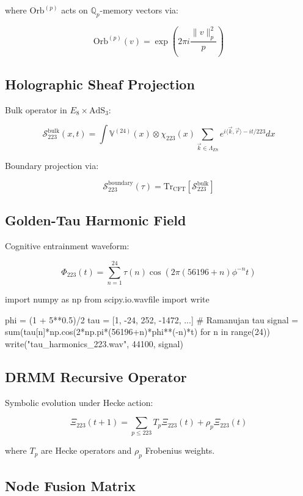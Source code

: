 \documentclass[12pt]{article}
\begin{document}
\begin{center}
where $\text{Orb}^{(p)}$ acts on $\mathbb{Q}_p$-memory vectors via:

\[
\text{Orb}^{(p)}(v) = \exp\left(2\pi i \frac{\|v\|_p^2}{p}\right)
\]

\subsection{Holographic Sheaf Projection}
\label{subsec:sheaf}

Bulk operator in $E_8 \times \text{AdS}_3$:

\[
\mathcal{S}_{223}^{\text{bulk}}(x,t) = \int \mathbb{V}^{(24)}(x) \otimes \chi_{223}(x) \sum_{\vec{k}\in\Lambda_{E8}} e^{i\langle \vec{k},\vec{r}\rangle - it/223} dx
\]

Boundary projection via:

\[
\mathcal{S}_{223}^{\text{boundary}}(\tau) = \text{Tr}_{\text{CFT}}\left[\mathcal{S}_{223}^{\text{bulk}}\right]
\]

\subsection{Golden-Tau Harmonic Field}
\label{subsec:tau}

Cognitive entrainment waveform:

\[
\Phi_{223}(t) = \sum_{n=1}^{24} \tau(n) \cos\left(2\pi (56196 + n)\phi^{-n}t\right)
\]

\begin{python}
import numpy as np
from scipy.io.wavfile import write

phi = (1 + 5**0.5)/2
tau = [1, -24, 252, -1472, ...] # Ramanujan tau
signal = sum(tau[n]*np.cos(2*np.pi*(56196+n)*phi**(-n)*t) 
           for n in range(24))
write("tau_harmonics_223.wav", 44100, signal)
\end{python}

\subsection{DRMM Recursive Operator}
\label{subsec:drmm}

Symbolic evolution under Hecke action:

\[
\Xi_{223}(t+1) = \sum_{p\leq223} T_p \Xi_{223}(t) + \rho_p \Xi_{223}(t)
\]

where $T_p$ are Hecke operators and $\rho_p$ Frobenius weights.

\subsection{Node Fusion Matrix}
\label{subsec:fusion}


\end{center}
\end{document}
